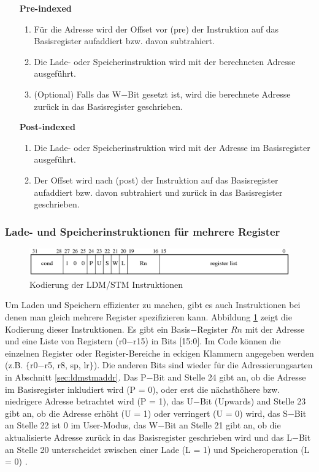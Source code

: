 \documentclass[a4paper, 11pt, onecolumn]{article}
\begin{document}
\begin{itemize}[labelwidth=7.5em,leftmargin =\dimexpr{}+\relax, align=parleft]
\item[\textbf{Pre-indexed}]
\begin{enumerate}[labelindent=0em,labelsep=0.5cm,leftmargin=*]
\item Für die Adresse wird der Offset vor (pre) der Instruktion auf das Basisregister aufaddiert bzw. davon subtrahiert.
\item Die Lade- oder Speicherinstruktion wird mit der berechneten Adresse ausgeführt.
\item (Optional) Falls das W$-$Bit gesetzt ist, wird die berechnete Adresse zurück in das Basisregister geschrieben.
\end{enumerate}
\item[\textbf{Post-indexed}]
\begin{enumerate}[labelindent=0em,labelsep=0.5cm,leftmargin=*]
\item Die Lade- oder Speicherinstruktion wird mit der Adresse im Basisregister ausgeführt.
\item Der Offset wird nach (post) der Instruktion auf das Basisregister aufaddiert bzw. davon subtrahiert und zurück in das Basisregister geschrieben.
\end{enumerate}
\end{itemize}

\subsubsection{Lade- und Speicherinstruktionen für mehrere Register}

\begin{figure}[!htb]
\centering
\includegraphics[width=1\textwidth]{data/ldmstm}
\caption{Kodierung der LDM/STM Instruktionen \cite{arm:2005}}
\label{fig:ldmstm}
\end{figure}

Um Laden und Speichern effizienter zu machen, gibt es auch Instruktionen bei denen man gleich mehrere Register spezifizieren kann. Abbildung \ref{fig:ldmstm} zeigt die Kodierung dieser Instruktionen. Es gibt ein Basis$-$Register $Rn$ mit der Adresse und eine Liste von Registern (r0$-$r15) in Bits $[$15:0$]$. Im Code können die einzelnen Register oder Register-Bereiche in eckigen Klammern angegeben werden (z.B. $\lbrace$r0$-$r5, r8, sp, lr$\rbrace$). Die anderen Bits sind wieder für die Adressierungsarten in Abschnitt \ref{sec:ldmstmaddr}. Das P$-$Bit and Stelle 24 gibt an, ob die Adresse im Basisregister inkludiert wird (P = 0), oder erst die nächsthöhere bzw. niedrigere Adresse betrachtet wird (P = 1), das U$-$Bit (Upwards) and Stelle 23 gibt an, ob die Adresse erhöht (U = 1) oder verringert (U = 0) wird, das S$-$Bit an Stelle 22 ist 0 im User-Modus, das W$-$Bit an Stelle 21 gibt an, ob die aktualisierte Adresse zurück in das Basisregister geschrieben wird und das L$-$Bit an Stelle 20 unterscheidet zwischen einer Lade (L = 1) und Speicheroperation (L = 0) \cite{arm:2005}.
\end{document}
